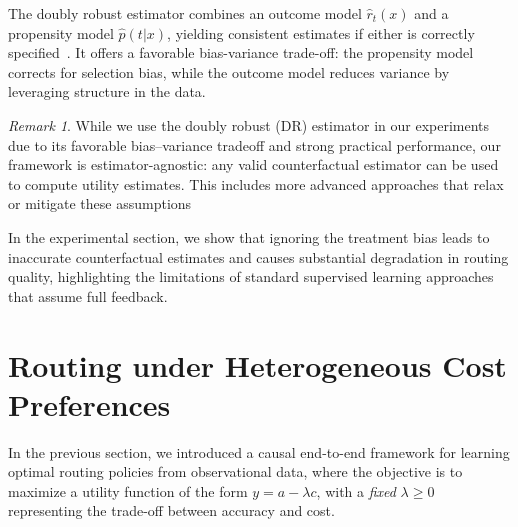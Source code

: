 \documentclass{article}
\theoremstyle{remark}
\newtheorem{remark}{Remark}
\begin{document}



The doubly robust estimator combines an outcome model $\hat{r}_t(x)$ and a propensity model $\hat{p}(t|x)$, yielding consistent estimates if either is correctly specified~\citep{dudik2011doubly}. It offers a favorable bias-variance trade-off: the propensity model corrects for selection bias, while the outcome model reduces variance by leveraging structure in the data.\\


\begin{remark}
     While we use the doubly robust (DR) estimator in our experiments due to its favorable bias–variance tradeoff and strong practical performance, our framework is estimator-agnostic: any valid counterfactual estimator can be used to compute utility estimates. This includes more advanced approaches that relax or mitigate these assumptions
\end{remark}
    


In the experimental section, we show that %
ignoring the treatment bias leads to inaccurate counterfactual estimates and causes substantial degradation in routing quality, highlighting the limitations of standard supervised learning approaches that assume full feedback.


\section{Routing under Heterogeneous Cost Preferences}\label{sec:multi_task}





In the previous section, we introduced a causal end-to-end framework for learning optimal routing policies from observational data, where the objective is to maximize a utility function of the form $y = a - \lambda c$, with a \emph{fixed} \( \lambda \geq 0 \) representing the trade-off between accuracy and cost.
\end{document}
